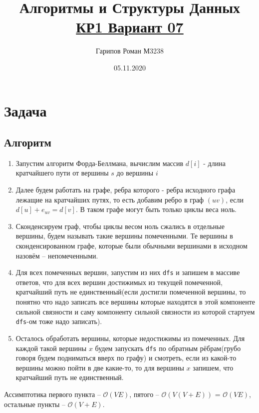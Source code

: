 \documentclass{article}
\title{Алгоритмы и Структуры Данных \Large{\href{https://nerc.itmo.ru/teaching/algo/year2019/quiz-05/d576180f2ecf1d65401da8ffbe7b8726.pdf}{\textcolor{myblue}{КР1 Вариант 07}}}}
\date{05.11.2020}
\author{Гарипов Роман М3238}
\newcommand{\complexity}[1]{$\mathcal{O}(#1)$}
\begin{document}
  \maketitle
\section*{Задача }
\subsection*{Алгоритм}
    \begin{enumerate}
        \item Запустим алгоритм Форда-Беллмана, вычислим массив $d[i]$ - длина кратчайшего пути от вершины $s$ до вершины $i$%
        \item Далее будем работать на графе, ребра которого - ребра исходного графа лежащие на кратчайших путях, то есть добавим ребро в граф $(uv)$, если $d[u] + e_{uv} = d[v]$. В таком графе могут быть только циклы веса ноль.
        \item Сконденсируем граф, чтобы циклы весом ноль сжались в отдельные вершины, будем называть такие вершины помеченными. Те вершины в сконденсированном графе, которые были обычными вершинами в исходном назовём -- непомеченными.
        \item Для всех помеченных вершин, запустим из них \texttt{dfs} и запишем в массиве ответов, что для всех вершин достижимых из текущей помеченной, кратчайший путь не единственный(если достигли помеченной вершины, то понятно что надо записать все вершины которые находятся в этой компоненте сильной связности и саму компоненту сильной связности из которой стартуем \texttt{dfs}-ом тоже надо записать). 
        \item Осталось обработать вершины, которые недостижимы из помеченных. Для каждой такой вершины $x$ будем запускать \texttt{dfs} по обратным рёбрам(грубо говоря будем подниматься вверх по графу) и смотреть, если из какой-то вершины можно пойти в две какие-то, то для вершины $x$ запишем, что кратчайший путь не единственный.
    \end{enumerate}
    Ассимптотика первого пункта -- \complexity{VE}, пятого -- \complexity{V(V + E)} = \complexity{VE}, остальные пункты -- \complexity{V + E}.
\end{document}
